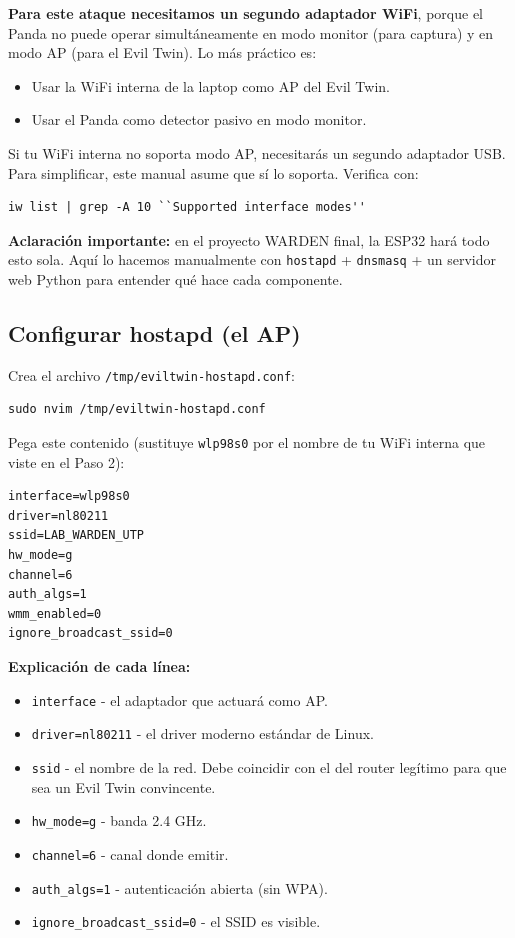 \documentclass[11pt,a4paper]{article}
\begin{document}
\textbf{Para este ataque necesitamos un segundo adaptador WiFi}, porque
el Panda no puede operar simultáneamente en modo monitor (para captura)
y en modo AP (para el Evil Twin). Lo más práctico es:

\begin{itemize}
  \item Usar la WiFi interna de la laptop como AP del Evil Twin.
  \item Usar el Panda como detector pasivo en modo monitor.
\end{itemize}

Si tu WiFi interna no soporta modo AP, necesitarás un segundo adaptador
USB. Para simplificar, este manual asume que sí lo soporta. Verifica con:

\begin{lstlisting}
iw list | grep -A 10 ``Supported interface modes''
\end{lstlisting}

\textbf{Aclaración importante:} en el proyecto WARDEN final, la ESP32
hará todo esto sola. Aquí lo hacemos manualmente con \texttt{hostapd} +
\texttt{dnsmasq} + un servidor web Python para entender qué hace cada
componente.

\subsection{Configurar hostapd (el AP)}
Crea el archivo \texttt{/tmp/eviltwin-hostapd.conf}:

\begin{lstlisting}
sudo nvim /tmp/eviltwin-hostapd.conf
\end{lstlisting}

Pega este contenido (sustituye \texttt{wlp98s0} por el nombre de tu WiFi
interna que viste en el Paso 2):

\begin{lstlisting}
interface=wlp98s0
driver=nl80211
ssid=LAB_WARDEN_UTP
hw_mode=g
channel=6
auth_algs=1
wmm_enabled=0
ignore_broadcast_ssid=0
\end{lstlisting}

\textbf{Explicación de cada línea:}

\begin{itemize}
  \item \texttt{interface} - el adaptador que actuará como AP.
  \item \texttt{driver=nl80211} - el driver moderno estándar de Linux.
  \item \texttt{ssid} - el nombre de la red. Debe coincidir con el del
    router legítimo para que sea un Evil Twin convincente.
  \item \texttt{hw\_mode=g} - banda 2.4 GHz.
  \item \texttt{channel=6} - canal donde emitir.
  \item \texttt{auth\_algs=1} - autenticación abierta (sin WPA).
  \item \texttt{ignore\_broadcast\_ssid=0} - el SSID es visible.
\end{itemize}
\end{document}
